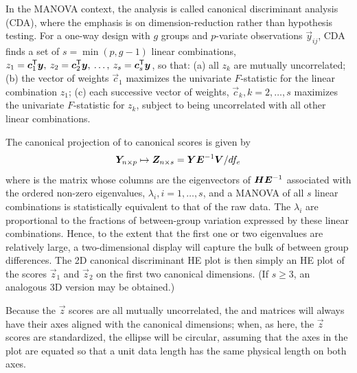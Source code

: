 
In the MANOVA context, the analysis is called canonical discriminant analysis (CDA), where the emphasis
is on dimension-reduction rather than hypothesis testing. 
For a one-way design with $g$ groups and $p$-variate
observations $\vec{y}_{ij}$, CDA finds a set of $s = \min(p, g-1)$
linear combinations, $z_1 = \bm{c}_1 ^\mathsf{T} \bm{y}, \:
 z_2 = \bm{c}_2 ^\mathsf{T} \bm{y}, \: \dots, \:
 z_s = \bm{c}_s ^\mathsf{T} \bm{y}$,
so that: (a) all $z_k$ are mutually uncorrelated; (b) the vector of
weights $\vec{c}_1$ maximizes the univariate $F$-statistic for the
linear combination $z_1$; (c) each successive vector of weights,
$\vec{c}_k, k=2, \dots, s$ maximizes the univariate $F$-statistic
for $z_k$, subject to being uncorrelated with all other linear
combinations. 

The canonical projection of   to canonical scores  is given by 
\begin{equation}
\bm{Y}_{n \times p} \mapsto \bm{Z}_{n \times s} = \bm{Y} \bm{\bm{E}}^{-1} \bm{V} / df_e
\end{equation}
where  is the matrix whose columns are the eigenvectors of $\bm{H} \bm{\bm{E}}^{-1}$
associated with the ordered non-zero eigenvalues, \(\lambda_i, i=1,\dots, s\),
and
a MANOVA of all $s$ linear combinations is statistically
equivalent to that of the raw data.
The \(\lambda_i\)
are proportional to the fractions of between-group variation
expressed by these linear combinations.
Hence, to the extent that the first one or two
eigenvalues are relatively large, a two-dimensional display will
capture the bulk of between group differences. The 2D canonical
discriminant HE plot is then simply an HE plot of the scores
$\vec{z}_1$ and $\vec{z}_2$ on the first two canonical dimensions.
(If $s\ge3$, an analogous 3D version may be obtained.)

Because the $\vec{z}$ scores are all mutually uncorrelated, the  and
 matrices will always have their axes aligned with the
canonical dimensions; when, as here, the $\vec{z}$ scores are
standardized, the  ellipse will be circular, assuming that
the axes in the plot are equated so that a unit data length has the same
physical length on both axes.

